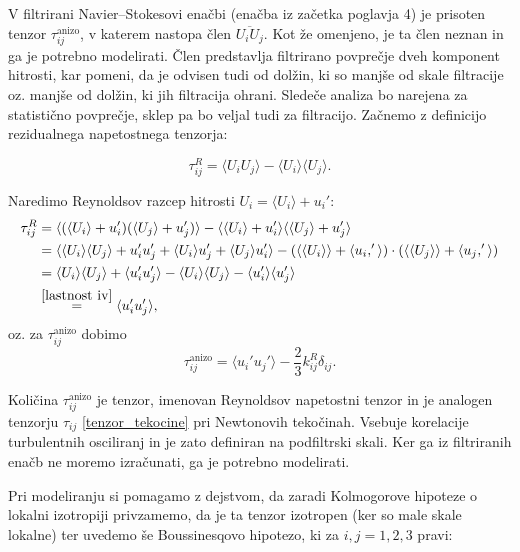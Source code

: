 \documentclass[mat2, tisk]{fmfdelo}
\begin{document}
V filtrirani Navier–Stokesovi enačbi (enačba iz začetka poglavja 4) je
prisoten tenzor $\tau_{ij}^{\mathrm{anizo}}$, v katerem nastopa člen
$\overline{U_i U_j}$. Kot že omenjeno, je ta člen neznan in ga je
potrebno modelirati. Člen predstavlja filtrirano povprečje dveh
komponent hitrosti, kar pomeni, da je odvisen tudi od dolžin, ki so 
manjše od skale filtracije oz. manjše od dolžin, ki jih filtracija ohrani.
Sledeče analiza bo narejena za statistično povprečje, sklep pa bo veljal tudi za filtracijo.  
Začnemo z definicijo rezidualnega napetostnega tenzorja:

$$
\tau_{ij}^R = \langle U_i U_j \rangle - \langle U_i \rangle \langle U_j \rangle.
$$

\noindent
Naredimo Reynoldsov razcep hitrosti $U_i = \langle U_i \rangle + u_i'$:
\begin{align*}
\tau_{ij}^R &= \langle (\langle U_i \rangle + u_i')(\langle U_j \rangle + u_j') \rangle - \langle \langle U_i \rangle + u_i' \rangle \langle \langle U_j \rangle + u_j' \rangle \\
&= \langle \langle U_i \rangle \langle U_j \rangle + u_i' u_j' + \langle U_i \rangle u_j' + \langle U_j \rangle u_i' \rangle - (\langle\langle U_i \rangle\rangle +\langle u_i,'\rangle) \cdot (\langle\langle U_j \rangle\rangle + \langle u_j,'\rangle)\\
&= \langle U_i\rangle \langle U_j \rangle + \langle u_i' u_j' \rangle - \langle U_i \rangle \langle U_j \rangle - \langle u_i' \rangle \langle u_j' \rangle \\
&\stackrel{\ref{lastnost iv}}{=} \langle u_i' u_j' \rangle,
\end{align*}
oz. za  $\tau_{ij}^{\mathrm{anizo}}$ dobimo 
\begin{equation*}
\tau_{ij}^{\mathrm{anizo}} = \langle u_i' u_j' \rangle - \frac{2}{3}k_{ij}^R\delta_{ij}.   
\end{equation*}

Količina $\tau_{ij}^{\mathrm{anizo}}$ je tenzor, imenovan
Reynoldsov napetostni tenzor in je analogen tenzorju
$\tau_{ij}$ \eqref{tenzor_tekocine} pri Newtonovih tekočinah. Vsebuje korelacije turbulentnih
osciliranj in je zato definiran na podfiltrski skali. Ker ga iz
filtriranih enačb ne moremo izračunati, ga je potrebno modelirati.

Pri modeliranju si pomagamo z dejstvom, da zaradi Kolmogorove hipoteze o lokalni izotropiji privzamemo, da je ta tenzor izotropen (ker so male skale lokalne) ter uvedemo
še Boussinesqovo hipotezo, ki za $i, j = 1, 2, 3$ pravi:
\end{document}
